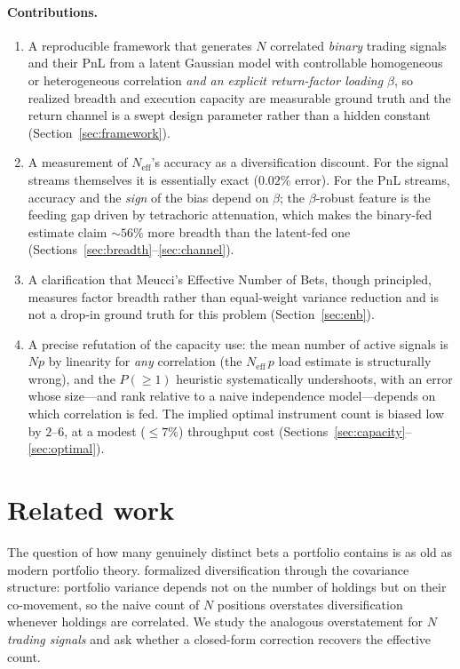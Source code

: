 \documentclass[11pt]{article}
\newcommand{\Neff}{N_{\mathrm{eff}}}
\begin{document}
\paragraph{Contributions.}
\begin{enumerate}\itemsep2pt
\item A reproducible framework that generates $N$ correlated \emph{binary} trading
signals and their PnL from a latent Gaussian model with controllable
homogeneous or heterogeneous correlation \emph{and an explicit return-factor
loading $\beta$}, so realized breadth and execution capacity are measurable
ground truth and the return channel is a swept design parameter rather than a
hidden constant (Section~\ref{sec:framework}).
\item A measurement of $\Neff$'s accuracy as a diversification discount. For the
signal streams themselves it is essentially exact ($0.02\%$ error). For the PnL
streams, accuracy and the \emph{sign} of the bias depend on $\beta$; the
$\beta$-robust feature is the feeding gap driven by tetrachoric attenuation,
which makes the binary-fed estimate claim ${\sim}56\%$ more breadth than the
latent-fed one (Sections~\ref{sec:breadth}--\ref{sec:channel}).
\item A clarification that Meucci's Effective Number of Bets, though principled,
measures factor breadth rather than equal-weight variance reduction and is not a
drop-in ground truth for this problem (Section~\ref{sec:enb}).
\item A precise refutation of the capacity use: the mean number of active signals
is $Np$ by linearity for \emph{any} correlation (the $\Neff\,p$ load estimate is
structurally wrong), and the $P(\ge1)$ heuristic systematically undershoots,
with an error whose size---and rank relative to a naive independence
model---depends on which correlation is fed. The implied optimal instrument
count is biased low by $2$--$6$, at a modest ($\le 7\%$) throughput cost
(Sections~\ref{sec:capacity}--\ref{sec:optimal}).
\end{enumerate}

\section{Related work}
\label{sec:related}

The question of how many genuinely distinct bets a portfolio contains is as old as
modern portfolio theory. \citet{markowitz1952portfolio} formalized diversification
through the covariance structure: portfolio variance depends not on the number of
holdings but on their co-movement, so the naive count of $N$ positions overstates
diversification whenever holdings are correlated. We study the analogous
overstatement for $N$ \emph{trading signals} and ask whether a closed-form
correction recovers the effective count.
\end{document}
